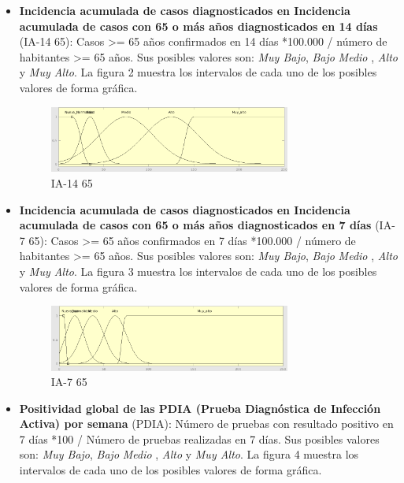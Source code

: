 \documentclass[12pt,a4paper, xcolor=table]{article}
\begin{document}
\begin{itemize}
    \item \textbf{Incidencia acumulada de casos diagnosticados en Incidencia acumulada de casos con 65 o más años diagnosticados en 14 días} (IA-14 65): Casos >= 65 años confirmados en 14 días *100.000 / número de habitantes >= 65 años. Sus posibles valores son: \textit{Muy Bajo}, \textit{Bajo} \textit{Medio }, {\textit{Alto}} y {\textit{Muy Alto}}. La figura 2 muestra los intervalos de cada uno de los posibles valores de forma gráfica.
    
    \begin{figure}[!h]
      \centering
      \includegraphics[width=300px]{img/ia_65_14.png}
      \caption{IA-14 65}
      \label{IA-14 65}
    \end{figure}

    \item \textbf{Incidencia acumulada de casos diagnosticados en Incidencia acumulada de casos con 65 o más años diagnosticados en 7 días} (IA-7 65): Casos >= 65 años confirmados en 7 días *100.000 / número de habitantes >= 65 años. Sus posibles valores son: \textit{Muy Bajo}, \textit{Bajo} \textit{Medio }, {\textit{Alto}} y {\textit{Muy Alto}}. La figura 3 muestra los intervalos de cada uno de los posibles valores de forma gráfica.
    
    \begin{figure}[!h]
      \centering
      \includegraphics[width=300px]{img/ia_65_7.png}
      \caption{IA-7 65}
      \label{IA-7 65}
    \end{figure}

    \item \textbf{Positividad global de las PDIA (Prueba Diagnóstica de Infección Activa) por semana} (PDIA): Número de pruebas con resultado positivo en 7 días *100 / Número de pruebas realizadas en 7 días. Sus posibles valores son: \textit{Muy Bajo}, \textit{Bajo} \textit{Medio }, {\textit{Alto}} y {\textit{Muy Alto}}. La figura 4 muestra los intervalos de cada uno de los posibles valores de forma gráfica.
    

\end{itemize}
\end{document}
